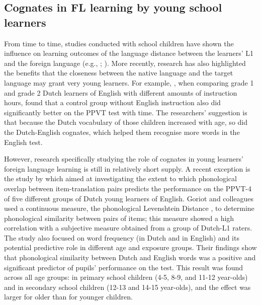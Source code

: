 \documentclass[output=paper,modfonts,nonflat,newtxmath]{langsci/langscibook}
\begin{document}
\subsection{{Cognates} {in} {FL} {learning} {by} {young} {school} {learners}}

{From time to time, studies conducted with school children have shown the influence on learning outcomes of the language distance between the learners’ L1 and the foreign language (e.g., \citealt{BildSwain1989}; \citealt{DYdewallevandePoel1999}). More recently, research has also highlighted the benefits that the closeness between the native language and the target language may grant very young learners. For example, \citet{UnsworthEtAl2015}, when comparing grade 1 and grade 2 Dutch learners of English with different amounts of instruction hours, found that a control group without English instruction also did significantly better on the PPVT test with time. The researchers’ suggestion is that because the Dutch vocabulary of those children increased with age, so did the Dutch-English cognates, which helped them recognise more words in the English test.}

{However, research specifically studying the role of cognates in young learners’ foreign language learning is still in relatively short supply. A recent exception is the study by \citet{GoriotEtAl2018} which aimed at investigating the extent to which phonological overlap between item-translation pairs predicts the performance on the PPVT-4 of five different groups of Dutch young learners of English. Goriot and colleagues used a continuous measure, the phonological Levenshtein Distance \citep{SchepensEtAl2013}, to determine phonological similarity between pairs of items; this measure showed a high correlation with a subjective measure obtained from a group of Dutch-L1 raters. The study also focused on word frequency (in Dutch and in English) and its potential predictive role in different age and exposure groups. Their findings show that phonological similarity between Dutch and English words was a positive and significant predictor of pupils’ performance on the test. This result was found across all age groups: in primary school children (4-5, 8-9, and 11-12 year-olds) and in secondary school children (12-13 and 14-15 year-olds), and the effect was larger for older than for younger children.}
\end{document}
